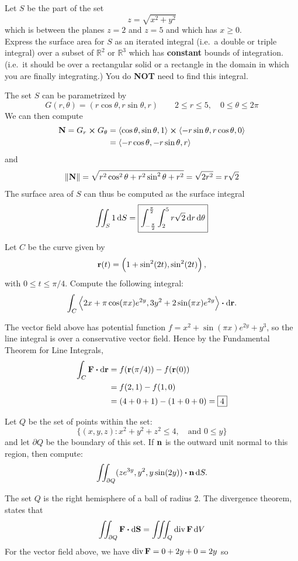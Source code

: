 \documentclass[12pt,answers]{exam}
\newcommand{\vect}[1]{\left\langle #1 \right\rangle}
\newcommand{\tdiv}{\operatorname{div}}
\newcommand{\RR}{\mathbb{R}}
\begin{document}
\begin{questions}
  \newpage
  \question
  Let $S$ be the part of the set 
  \[
  z = \sqrt{x^2 + y^2}
  \]
  which is between the planes $z=2$ and $z=5$ and which has $x \ge 0$. \\ 
  Express the surface area for $S$ as an iterated integral (i.e.~a double or triple integral) over a subset of $\RR^2$ or $\RR^3$ which has \textbf{constant} bounds of integration. (i.e.~it should be over a rectangular solid or a rectangle in the domain in which you are finally integrating.) You do \textbf{NOT} need to find this integral.
  \begin{solution}
    The set $S$ can be parametrized by 
    \[
    G(r, \theta) = (r\cos \theta, r\sin\theta, r) 
    \qquad 2 \le r \le 5, 
    \quad 0 \le \theta \le 2\pi
    \]
    We can then compute
    \begin{align*}
      \vb{N} = G_r \cross G_\theta 
      &= \vect{\cos \theta, \sin\theta, 1} \cross \vect{-r\sin\theta, r\cos\theta, 0}  \\ 
      &= \vect{-r\cos\theta, -r\sin\theta, r}
    \end{align*}
    and
    \[
    \|\vb{N}\| = \sqrt{r^2\cos^2\theta+r^2\sin^2\theta+r^2} = \sqrt{2r^2} = r\sqrt 2
    \]
    The surface area of $S$ can thus be computed as the surface integral
    \[
    \iint_S 1 \dif S  = \boxed{\int_{-\frac\pi2}^{\frac\pi2} \int_2^5 r \sqrt 2 \dif r \dif \theta}
    \]
  \end{solution}
  
  \newpage
  \question
  Let $C$ be the curve given by
  \[
  \vb{r}(t) = \left(
    1+\sin^2(2t),
    \sin^2(2t)
  \right),
  \]
  with $0 \le t \le \pi/4$. Compute the following integral:
  \[
  \int_C \vect{2x+\pi \cos(\pi x)e^{2y}, 3y^2+2\sin(\pi x)e^{2y}} \vdot \dif \vb{r}.
  \]
  \begin{solution}
    The vector field above has potential function $f = x^2 + \sin(\pi x)e^{2y} + y^3$, so the line integral is over a conservative vector field.
    Hence by the Fundamental Theorem for Line Integrals,
    \begin{align*}
      \int_C \vb{F} \vdot \dif \vb{r}
      & = f(\vb{r}(\pi/4)) - f(\vb{r}(0)) \\
      & = f(2,1) - f(1,0)   \\
      & = (4+0+1) - (1+0+0)
      = \boxed{4}
    \end{align*}
  \end{solution}
  
  \newpage
  \question
  Let $Q$ be the set of points within the set:
  \[
  \{ (x,y,z) : x^2+y^2+z^2 \le 4, \quad \text{and } 0 \le y \}
  \]
  and let $\partial Q$ be the boundary of this set. If $\vb{n}$ is the outward unit normal to this region, then compute:
  \[
  \iint_{\partial Q} (ze^{3y}, y^2, y\sin(2y)) \vdot \vb{n} \dif S.
  \]
  \begin{solution}
    The set $Q$ is the right hemisphere of a ball of radius 2.
    The divergence theorem, states that
    \[
    \iint_{\partial Q} \vb{F} \vdot \dif \vb{S} = \iiint_{Q} \tdiv \vb F \dif V
    \]
    For the vector field above, we have $\tdiv \vb F = 0 + 2y + 0 = 2y$
    so 


\end{solution}
\end{questions}
\end{document}
